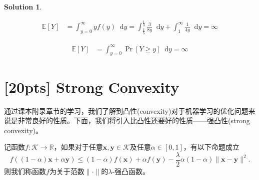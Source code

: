 \documentclass[a4paper,UTF8]{article}
\numberwithin{equation}{section}
\newtheorem*{mySol}{Solution}
\newcommand*\diff{\mathop{}\!\mathrm{d}}
\begin{document}
\begin{mySol}
\begin{enumerate}
\begin{equation}
\begin{aligned}
\mathbb{E}[Y] &= \int_{y=0}^{\infty}yf(y) \diff y = \int_{\frac{1}{5}}^{\frac{1}{3}}\frac{3}{8y}\diff y + \int_{1}^{\infty}\frac{1}{4y}\diff y = \infty
\end{aligned}
\end{equation}

\begin{equation}
\begin{aligned}
\mathbb{E}[Y] &= \int_{y=0}^{\infty}\Pr[Y \geq y] \diff y = \infty
\end{aligned}
\end{equation}

\end{enumerate}

\end{mySol}

\newpage

\section{[20pts] Strong Convexity}
通过课本附录章节的学习，我们了解到凸性(convexity)对于机器学习的优化问题来说是非常良好的性质。下面，我们将引入比凸性还要好的性质——强凸性(strong convexity)。
\begin{def-box}[强凸性]
记函数$f: \mathcal{K} \rightarrow \mathbb{R}$，如果对于任意$\mathbf{x}, \mathbf{y} \in \mathcal{K}$及任意$\alpha\in[0,1]$，有以下命题成立
\begin{equation}
  \label{eq-sc-1}
  f((1-\alpha)\mathbf{x} + \alpha\mathbf{y})\leq (1-\alpha)f(\mathbf{x}) + \alpha f(\mathbf{y}) - \frac{\lambda}{2}\alpha(1-\alpha)\lVert \mathbf{x} - \mathbf{y}\rVert^2.
\end{equation}
则我们称函数$f$为关于范数$\lVert \cdot \rVert$的$\lambda$-强凸函数。
\end{def-box}
\end{document}
